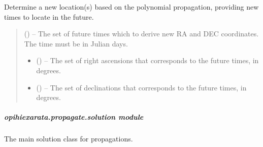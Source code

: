 \documentclass[letterpaper,11pt,english]{sphinxmanual}
\begin{document}
\begin{savenotes}
\begin{fulllineitems}
\begin{savenotes}\begin{fulllineitems}
\label{\detokenize{code/opihiexarata.propagate.polynomial:opihiexarata.propagate.polynomial.QuadraticPropagationEngine.forward_propagate}}
\pysigstartsignatures
{}
\pysigstopsignatures
\sphinxAtStartPar
Determine a new location(s) based on the polynomial propagation,
providing new times to locate in the future.
\begin{quote}\begin{description}
\sphinxAtStartPar
{} () – The set of future times which to derive new RA and DEC coordinates.
The time must be in Julian days.

\sphinxAtStartPar
\begin{itemize}
\item {} 
\sphinxAtStartPar
{} () – The set of right ascensions that corresponds to the future times,
in degrees.

\item {} 
\sphinxAtStartPar
{} () – The set of declinations that corresponds to the future times, in
degrees.

\end{itemize}


\end{description}\end{quote}

\end{fulllineitems}\end{savenotes}


\end{fulllineitems}\end{savenotes}


\sphinxstepscope


\subparagraph{opihiexarata.propagate.solution module}
\label{\detokenize{code/opihiexarata.propagate.solution:module-opihiexarata.propagate.solution}}\label{\detokenize{code/opihiexarata.propagate.solution:opihiexarata-propagate-solution-module}}\label{\detokenize{code/opihiexarata.propagate.solution::doc}}
\sphinxAtStartPar
The main solution class for propagations.
\end{document}
